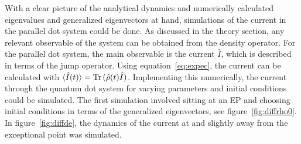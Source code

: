 \documentclass[../main.tex]{subfiles}
\begin{document}
With a clear picture of the analytical dynamics and numerically calculated eigenvalues and generalized eigenvectors at hand, simulations of the current in the parallel dot system could be done. As discussed in the theory section, any relevant observable of the system can be obtained from the density operator. For the parallel dot system, the main observable is the current $\hat I$, which is described in terms of the jump operator. Using equation~\eqref{eq:expec}, the current can be calculated with $\braket{\hat I(t)} = \operatorname{Tr}{(\hat \rho(t)\hat I)}$. Implementing this numerically, the current through the quantum dot system for varying parameters and initial conditions could be simulated. The first simulation involved sitting at an EP and choosing initial conditions in terms of the generalized eigenvectors, see figure~\ref{fig:diffrho0}. In figure~\ref{fig:diffde}, the dynamics of the current at and slightly away from the exceptional point was simulated.
\end{document}
